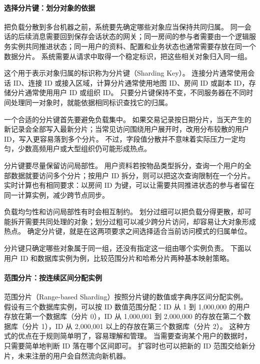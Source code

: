 \paragraph{选择分片键：划分对象的依据}

把负载分散到多台机器之前，系统要先确定哪些对象应当保持共同归属。
同一会话的后续消息需要回到保存会话状态的网关；同一房间的参与者需要由一个逻辑服务实例共同推进状态；同一用户的资料、配置和业务状态也通常需要存放在同一个数据分片。
系统需要从请求中取得一个稳定标识，把这些相关对象归入同一组。

这个用于表示对象归属的标识称为分片键（Sharding Key）。
连接分片通常使用会话 ID、连接 ID 或接入区域，计算分片通常使用地图 ID、房间 ID 或副本 ID，存储分片通常使用用户 ID 或组织 ID。
只要分片键保持不变，不同服务器在不同时间处理同一对象时，就能依据相同标识查找它的归属。

一个合适的分片键首先要避免负载集中。
如果交易记录按日期分片，当天产生的新记录会全部写入最新分片；当常见访问围绕用户展开时，改用分布较散的用户 ID，写入更容易落到多个分片。
不过，字段值分散并不意味着实际压力一定均匀，少数高频用户或大型组织仍可能形成热点。

分片键要尽量保留访问局部性。
用户资料若按物品类型拆分，查询一个用户的全部数据就要访问多个分片；按用户 ID 拆分，则可以把这次查询限制在一个分片。
实时计算也有相同要求：以房间 ID 为键，可以让需要共同推进状态的参与者留在同一计算实例，减少跨节点同步。

负载均匀性和访问局部性有时会相互制约。
划分过细可以把负载分得更散，却可能拆开需要共同处理的对象；划分过粗可以减少跨分片访问，却容易让大对象形成热点。
确定分片键，就是在这两项要求之间选择适合当前访问模式的归属单位。

分片键只确定哪些对象属于同一组，还没有指定这一组由哪个实例负责。
下面以用户 ID 和数据库实例为例，比较范围分片和哈希分片两种基本映射策略。

\paragraph{范围分片：按连续区间分配实例}

范围分片（Range-based Sharding）按照分片键的数值或字典序区间分配实例。
假设有三个数据库实例，可以按 ID 数值范围分配：ID 从 1 到 1,000,000 的用户存放在第一个数据库（分片 0），ID 从 1,000,001 到 2,000,000 的存放在第二个数据库（分片 1），ID 从 2,000,001 以上的存放在第三个数据库（分片 2）。
这种方式的优点在于规则简单明了，容易理解和管理。
当需要查询某个用户的数据时，只需要简单地判断 ID 落在哪个区间即可。
扩容时也可以把新的 ID 范围交给新分片，未来注册的用户会自然流向新机器。

